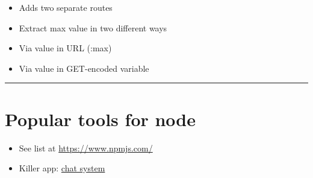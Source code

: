 \documentclass{article}[18pt]
\providecommand{\tightlist}{%
	\setlength{\itemsep}{0pt}\setlength{\parskip}{0pt}}
\begin{document}
\begin{itemize}
	\tightlist
	\item
	Adds two separate routes
	\item
	Extract max value in two different ways
	\item
	Via value in URL (:max)
	\item
	Via value in GET-encoded variable
\end{itemize}

\begin{center}\rule{0.5\linewidth}{\linethickness}\end{center}


	\section{Popular tools for node}

\begin{itemize}
	\tightlist
	\item
	See list at \url{https://www.npmjs.com/}
	\item
	Killer app: \href{http://socket.io/get-started/chat/}{chat system}
\end{itemize}
\end{document}
